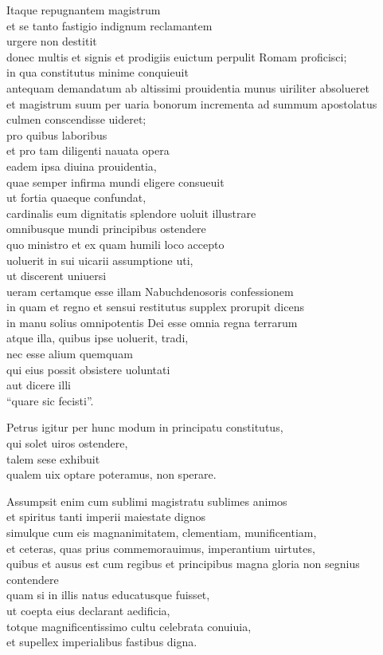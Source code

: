 \documentclass[a5paper,twoside]{article}
\begin{document}
Itaque repugnantem magistrum \\
et se tanto fastigio indignum reclamantem \\
urgere non destitit \\
donec multis et signis et prodigiis euictum perpulit Romam proficisci; \\
in qua constitutus minime conquieuit \\
antequam demandatum ab altissimi prouidentia munus uiriliter absolueret \\
et magistrum suum per uaria bonorum incrementa ad summum apostolatus culmen conscendisse uideret; \\
pro quibus laboribus \\
et pro tam diligenti nauata opera \\
eadem ipsa diuina prouidentia, \\
quae semper infirma mundi eligere consueuit \\
ut fortia quaeque confundat, \\
cardinalis eum dignitatis splendore uoluit illustrare \\
omnibusque mundi principibus ostendere \\
quo ministro et ex quam humili loco accepto \\
uoluerit in sui uicarii assumptione uti, \\
ut discerent uniuersi \\
ueram certamque esse illam Nabuchdenosoris confessionem \\
in quam et regno et sensui restitutus supplex prorupit dicens \\
in manu solius omnipotentis Dei esse omnia regna terrarum \\
atque illa, quibus ipse uoluerit, tradi, \\
nec esse alium quemquam \\
qui eius possit obsistere uoluntati \\
aut dicere illi \\
``quare sic fecisti''.

Petrus igitur per hunc modum in principatu constitutus, \\
qui solet uiros ostendere, \\
talem sese exhibuit \\
qualem uix optare poteramus, non sperare. 

Assumpsit enim cum sublimi magistratu sublimes animos \\
et spiritus tanti imperii maiestate dignos \\
simulque cum eis magnanimitatem, clementiam, munificentiam, \\
et ceteras, quas prius commemorauimus, imperantium uirtutes, \\
quibus et ausus est cum regibus et principibus magna gloria non segnius contendere \\
quam si in illis natus educatusque fuisset, \\
ut coepta eius declarant aedificia, \\
totque magnificentissimo cultu celebrata conuiuia, \\
et supellex imperialibus fastibus digna. 
\end{document}
